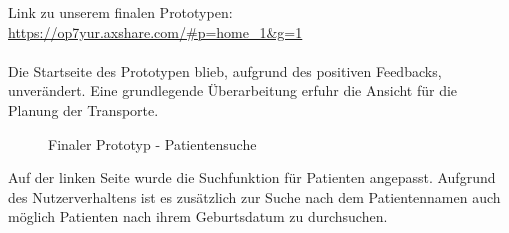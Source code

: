\documentclass[a4paper, ngerman, 12pt]{scrartcl}
\begin{document}
Link zu unserem finalen Prototypen: \href{https://op7yur.axshare.com/#p=home_1&g=1}{https://op7yur.axshare.com/\#p=home\_1\&g=1}\\
\\
Die Startseite des Prototypen blieb, aufgrund des positiven Feedbacks, unverändert. Eine grundlegende Überarbeitung erfuhr die Ansicht für die Planung der Transporte.
\begin{figure}[h]
\centering
{}
\caption{Finaler Prototyp - Patientensuche}
\label{img:patsearch}
\end{figure}
Auf der linken Seite wurde die Suchfunktion für Patienten angepasst. Aufgrund des Nutzerverhaltens ist es zusätzlich zur Suche nach dem Patientennamen auch möglich Patienten nach ihrem Geburtsdatum zu durchsuchen.
\end{document}
